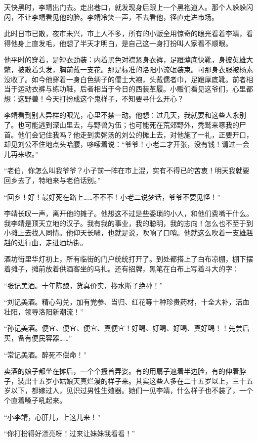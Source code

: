 天快黑时，李靖出门去。走出巷口，就发现身后跟上一个黑袍道人。那个人躲躲闪闪，不让李靖看见他的脸。李靖冷笑一声，不去看他，径直走进市场。

此时日市已散，夜市未兴，市上人不多，所有的小贩全用惊奇的眼光看着李靖，看得他身上直发毛，他想了半天才明白，是自己这一身打扮叫人家看不顺眼。

他平时的穿着，是短衣劲装：内着黑色对襟紧身衣裤，足蹬薄底快靴，身披英雄大氅，披散着头发，胸前戴一支花。那是标准的洛阳小流氓装束。可那身衣服被杨素没收了。如今他穿着一身白色绸子的儒士大袍，头戴儒者巾，足蹬厚底靴。前者相当于运动衣裤与练功鞋，后者相当于今日的西装革履。小贩们看见这爷们，心里都想：这野兽！今天打扮成这个鬼样子，不知要寻什么开心？

李靖看到别人异样的眼光，心里不禁一动。他想：过几天，我就要和这些人永别了。也可能逃到深山里去，与野兽为伍；也可能死在荒郊野外，秃鹫来啄我的尸首。他们会记住我吗？他走到卖粥汤的刘公的摊上去，对他施了一礼，正要开口，却见刘公不住地点头哈腰，哆嗦着说：“爷爷！小老二才开张，没有钱！请过一会儿再来收。”

“老伯，你怎么叫我爷爷？小子前一阵在市上混，实有不得已的苦衷！明天我就要回乡去了，特地来与老伯话别。”

“回乡！好！最好死在路上……不不不！小老二说梦话，爷爷不要见怪！”

李靖长叹一声，离开他的摊子。他想这不过是些委琐的小人，和他们费嘴干什么。我李靖是顶天立地的汉子。我有我的事业，我的聪明，我的志向！怎么也不至于到小摊上去找人同情。他仰天长啸，也就是说，吹响了口哨。他就这么吹着一支雄赳赳的进行曲，走进酒坊街。

酒坊街里华灯初上，所有临街的门户统统打开了。到处都搭上了白布凉棚，棚下摆着摊子，摊前放着供酒客坐的马扎。还有招牌，黑笔在白布上写着斗大的字：

“张记美酒。十年陈酿，货真价实，搀水断子绝孙！”

“刘记美酒。精心勾兑，加有党参、当归、红花等十种珍贵药材，十全大补，活血壮阳，领导洛阳新潮流！”

“孙记美酒。便宜、便宜、便宜、真便宜！好喝、好喝、好喝、真好喝！！先尝后买，备有便民容器……”

“常记美酒。醉死不偿命！”

卖酒的娘子都坐在摊后，一个个搔首弄姿。有的用扇子遮着半边脸，有的伸着脖子，装出十五岁小姑娘天真烂漫的样子来。其实这些人多在二十五岁以上，三十五岁以下，都嫁过人，见识过男性生殖器。她们一见李靖，什么样子也不装了，一个个直着嗓子吼起来。

“小李靖，心肝儿，上这儿来！”

“你打扮得好漂亮呀！过来让妹妹我看看！”


